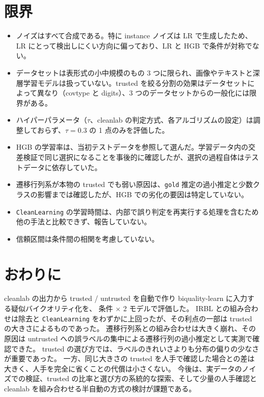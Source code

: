 \documentclass[a4paper,10pt]{ltjsarticle}
\newcommand{\cl}{\textsf{cleanlab}}
\newcommand{\bq}{\textsf{biquality-learn}}
\begin{document}
\section{限界}\label{sec:limit}
\begin{itemize}
  \item ノイズはすべて合成である。特に instance ノイズは LR で生成したため、LR にとって検出しにくい方向に偏っており、LR と HGB で条件が対称でない。
  \item データセットは表形式の小中規模のもの 3 つに限られ、画像やテキストと深層学習モデルは扱っていない。trusted を絞る分割の効果はデータセットによって異なり（covtype と digits）、3 つのデータセットからの一般化には限界がある。
  \item ハイパーパラメータ（$\tau$、\cl{} の判定方式、各アルゴリズムの設定）は調整しておらず、$\tau = 0.3$ の 1 点のみを評価した。
  \item HGB の学習率は、当初テストデータを参照して選んだ。学習データ内の交差検証で同じ選択になることを事後的に確認したが、選択の過程自体はテストデータに依存していた。
  \item 遷移行列系が本物の trusted でも弱い原因は、\texttt{gold} 推定の過小推定と少数クラスの影響までは確認したが、HGB での劣化の要因は特定していない。
  \item \texttt{CleanLearning} の学習時間は、内部で誤り判定を再実行する処理を含むため他の手法と比較できず、報告していない。
  \item 信頼区間は条件間の相関を考慮していない。
\end{itemize}

\section{おわりに}
\cl{} の出力から trusted / untrusted を自動で作り \bq{} に入力する疑似バイクオリティ化を、\NCond{} 条件 $\times$ 2 モデルで評価した。
IRBL との組み合わせは除去と \texttt{CleanLearning} をわずかに上回ったが、その利点の一部は trusted の大きさによるものであった。
遷移行列系との組み合わせは大きく崩れ、その原因は untrusted への誤ラベルの集中による遷移行列の過小推定として実測で確認できた。
trusted の選び方では、ラベルのきれいさよりも分布の偏りの少なさが重要であった。
一方、同じ大きさの trusted を人手で確認した場合との差は大きく、人手を完全に省くことの代償は小さくない。
今後は、実データのノイズでの検証、trusted の比率と選び方の系統的な探索、そして少量の人手確認と \cl{} を組み合わせる半自動の方式の検討が課題である。

\printbibliography[title=参考文献]
\end{document}
